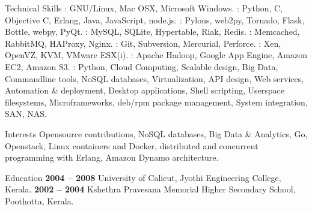 \documentclass{resume}
\begin{document}
\begin{category}{Technical Skills}
  : GNU/Linux, Mac OSX, Microsoft Windows.
  : Python, C, Objective
  C, Erlang, Java, JavaScript, node.js.
  : Pylons, web2py, Tornado, Flask, Bottle, webpy, PyQt.
  : MySQL, SQLite, Hypertable, Riak, Redis.
  : Memcached, RabbitMQ, HAProxy, Nginx.
  : Git, Subversion, Mercurial,
  Perforce.
  : Xen, OpenVZ, KVM, VMware ESX(i).
  : Apache Hadoop, Google App Engine, Amazon EC2, Amazon S3.
  : Python, Cloud Computing, Scalable design, Big Data, Commandline 
  tools, NoSQL databases, Virtualization, API design, Web services, Automation \& deployment, 
  Desktop applications, Shell scripting, Userspace filesystems,
  Microframeworks, deb/rpm package management, System integration, SAN, NAS.
\end{category}


\begin{category}{Interests}
  \citemnobullet Opensource contributions, NoSQL databases, Big Data \& Analytics, Go, Openstack,
  Linux containers and Docker, distributed and concurrent programming with Erlang, Amazon Dynamo architecture.
\end{category}


\begin{category}{Education}
   \hfill \textbf{2004 -- 2008}
  \citemnobullet University of Calicut, Jyothi Engineering College, Kerala.
   \hfill \textbf{2002 -- 2004}
  \citemnobullet Kshethra Pravesana Memorial Higher Secondary School, Poothotta, Kerala.
\end{category}

\end{document}

